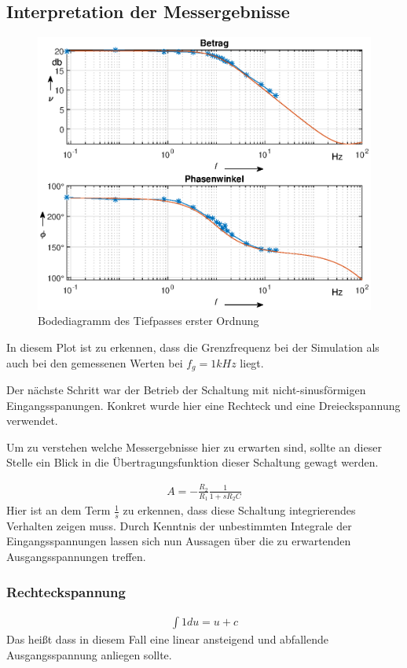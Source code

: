 \subsection{Interpretation der Messergebnisse}
\begin{figure}[H]
    \centering
    \includegraphics[width=\costumPicWidth]{Lab_2/Plots/TP_first_order.eps}
    \caption{Bodediagramm des Tiefpasses erster Ordnung}
    \label{fig:Bode_aktiver_Tiefpass}
\end{figure}
In diesem Plot ist zu erkennen, dass die Grenzfrequenz bei der Simulation als auch bei den gemessenen Werten bei $f_g = 1kHz$ liegt. 

Der nächste Schritt war der Betrieb der Schaltung mit nicht-sinusförmigen Eingangsspanungen. Konkret wurde hier eine Rechteck und eine Dreieckspannung verwendet.

Um zu verstehen welche Messergebnisse hier zu erwarten sind, sollte an dieser Stelle ein Blick in die Übertragungsfunktion dieser Schaltung gewagt werden.

\begin{align}
    A = -\frac{R_2}{R_1}\frac{1}{1+sR_2 C}
\end{align}
Hier ist an dem Term $\frac{1}{s} $ zu erkennen, dass diese Schaltung integrierendes Verhalten zeigen muss. Durch Kenntnis der unbestimmten Integrale der Eingangsspannungen lassen sich nun Aussagen über die zu erwartenden Ausgangsspannungen treffen.
\subsubsection{Rechteckspannung}
\begin{align}
    \int{1 du} = u + c
\end{align}
Das heißt dass in diesem Fall eine linear ansteigend und abfallende Ausgangsspannung anliegen sollte.

